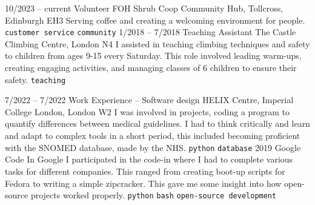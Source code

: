 \documentclass[9pt]{developercv} %
\begin{document}
\vspace{-10 pt}
\begin{entrylist}
	\entry
		{10/2023 -- current}
		{Volunteer FOH}
		{Shrub Coop Community Hub, Tollcross, Edinburgh EH3}
		{
			Serving coffee and creating a welcoming environment for people.
			\newline
			\texttt{customer service} \slashsep \texttt{community}
		}
	\entry
		{1/2018 -- 7/2018}
		{Teaching Assistant}
		{The Castle Climbing Centre, London N4}
		{
			I assisted in teaching climbing techniques and safety to children from ages 9-15 every Saturday.
			This role involved leading warm-ups, creating engaging activities, and managing classes of 6 children to ensure their safety.
			\newline
			\texttt{teaching}
		}
\end{entrylist}


\vspace{-10 pt}
\begin{entrylist}
	\entry
	{7/2022 -- 7/2022}
	{Work Experience – Software design}
	{HELIX Centre, Imperial College London, London W2}
	{
		I was involved in projects, coding a program to quantify differences between medical guidelines.
		I had to think critically and learn and adapt to complex tools in a short period, this included becoming proficient with the SNOMED database, made by the NHS. 
		\newline
		\texttt{python} \slashsep \texttt{database}
	}
	\entry
        {2019}
		{Google Code In}
		{Google}
		{
			I participated in the code-in where I had to complete various tasks for different companies. 
			This ranged from creating boot-up scripts for Fedora to writing a simple zipcracker. 
			This gave me some insight into how open-source projects worked properly. 
        	\newline
			\texttt{python} \slashsep \texttt{bash} \slashsep \texttt{open-source development}
		}
		
\end{entrylist}
\end{document}

